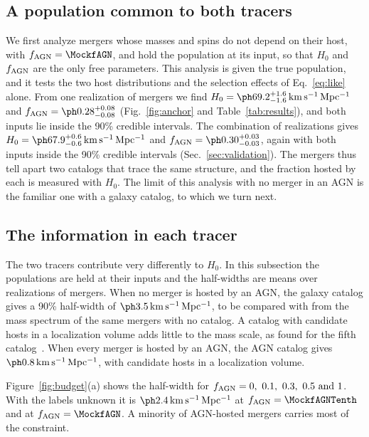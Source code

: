 \documentclass[aps,prd,reprint,amsmath,amssymb,nofootinbib]{revtex4-2}
\newcommand{\kmsMpc}{\,{\rm km\,s^{-1}\,Mpc^{-1}}}
\newcommand{\fAGN}{f_{\rm AGN}}
\begin{document}
\subsection{A population common to both tracers}
\label{sec:anchor}

We first analyze mergers whose masses and spins do not depend on their host, with $\fAGN=\MockfAGN$, and hold the population at its input, so that $H_0$ and $\fAGN$ are the only free parameters.
This analysis is given the true population, and it tests the two host distributions and the selection effects of Eq.~\eqref{eq:like} alone.
From one realization of \MockNev{} mergers we find $H_0=\IndAnchorHzero\kmsMpc$ and $\fAGN=\IndfAGNMix$ (Fig.~\ref{fig:anchor} and Table~\ref{tab:results}), and both inputs lie inside the 90\% credible intervals. %
The combination of \NrealKnown{} realizations gives $H_0=\IndRecHzeroComb\kmsMpc$ and $\fAGN=\IndRecfAGNComb$, again with both inputs inside the 90\% credible intervals (Sec.~\ref{sec:validation}). %
The mergers thus tell apart two catalogs that trace the same structure, and the fraction hosted by each is measured with $H_0$. %
The limit of this analysis with no merger in an AGN is the familiar one with a galaxy catalog, to which we turn next.

\subsection{The information in each tracer}
\label{sec:budget}

The two tracers contribute very differently to $H_0$.
In this subsection the populations are held at their inputs and the half-widths are means over \IndNreal{} realizations of \MockNev{} mergers.
When no merger is hosted by an AGN, the galaxy catalog gives a 90\% half-width of $\IndHWGal\kmsMpc$, to be compared with \IndHWSpec{} from the mass spectrum of the same mergers with no catalog. %
A catalog with \PureGalHostsPerVol{} candidate hosts in a localization volume adds little to the mass scale, as found for the fifth catalog~\cite{LIGOScientific:2026uyd}. %
When every merger is hosted by an AGN, the AGN catalog gives $\IndHWAGN\kmsMpc$, with \PureAGNHostsPerVol{} candidate hosts in a localization volume. %

Figure~\ref{fig:budget}(a) shows the half-width for $\fAGN=\IndfList$.
With the labels unknown it is $\IndHWMixTenth\kmsMpc$ at $\fAGN=\MockfAGNTenth$ and \IndHWMix{} at $\fAGN=\MockfAGN$. %
A minority of AGN-hosted mergers carries most of the constraint. %
\end{document}
